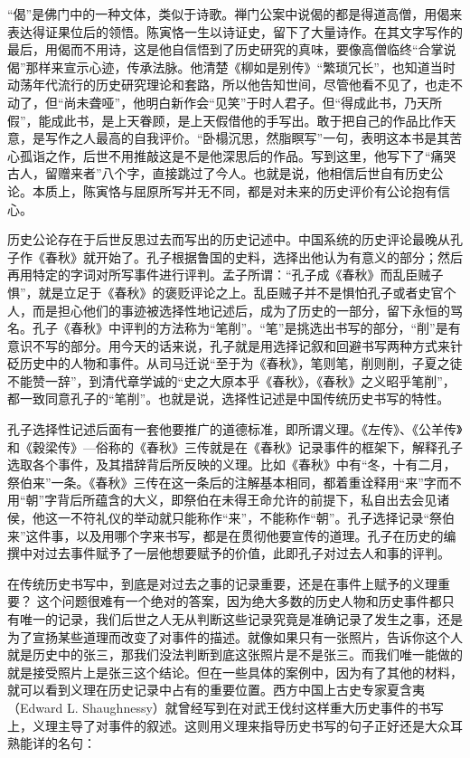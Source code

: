
“偈”是佛门中的一种文体，类似于诗歌。禅门公案中说偈的都是得道高僧，用偈来表达得证果位后的领悟。陈寅恪一生以诗证史，留下了大量诗作。在其文字写作的最后，用偈而不用诗，这是他自信悟到了历史研究的真味，要像高僧临终“合掌说偈”那样来宣示心迹，传承法脉。他清楚《柳如是别传》“繁琐冗长”，也知道当时动荡年代流行的历史研究理论和套路，所以他告知世间，尽管他看不见了，也走不动了，但“尚未聋哑”，他明白新作会“见笑”于时人君子。但“得成此书，乃天所假”，能成此书，是上天眷顾，是上天假借他的手写出。敢于把自己的作品比作天意，是写作之人最高的自我评价。“卧榻沉思，然脂瞑写”一句，表明这本书是其苦心孤诣之作，后世不用推敲这是不是他深思后的作品。写到这里，他写下了“痛哭古人，留赠来者”八个字，直接跳过了今人。也就是说，他相信后世自有历史公论。本质上，陈寅恪与屈原所写并无不同，都是对未来的历史评价有公论抱有信心。



历史公论存在于后世反思过去而写出的历史记述中。中国系统的历史评论最晚从孔子作《春秋》就开始了。孔子根据鲁国的史料，选择出他认为有意义的部分；然后再用特定的字词对所写事件进行评判。孟子所谓：“孔子成《春秋》而乱臣贼子惧”，就是立足于《春秋》的褒贬评论之上。乱臣贼子并不是惧怕孔子或者史官个人，而是担心他们的事迹被选择性地记述后，成为了历史的一部分，留下永恒的骂名。孔子《春秋》中评判的方法称为“笔削”。“笔”是挑选出书写的部分，“削”是有意识不写的部分。用今天的话来说，孔子就是用选择记叙和回避书写两种方式来针砭历史中的人物和事件。从司马迁说“至于为《春秋》，笔则笔，削则削，子夏之徒不能赞一辞”，到清代章学诚的“史之大原本乎《春秋》，《春秋》之义昭乎笔削”，都一致同意孔子的“笔削”。也就是说，选择性记述是中国传统历史书写的特性。



孔子选择性记述后面有一套他要推广的道德标准，即所谓义理。《左传》、《公羊传》和《穀梁传》—俗称的《春秋》三传就是在《春秋》记录事件的框架下，解释孔子选取各个事件，及其措辞背后所反映的义理。比如《春秋》中有“冬，十有二月，祭伯来”一条。《春秋》三传在这一条后的注解基本相同，都着重诠释用“来”字而不用“朝”字背后所蕴含的大义，即祭伯在未得王命允许的前提下，私自出去会见诸侯，他这一不符礼仪的举动就只能称作“来”，不能称作“朝”。孔子选择记录“祭伯来”这件事，以及用哪个字来书写，都是在贯彻他要宣传的道理。孔子在历史的编撰中对过去事件赋予了一层他想要赋予的价值，此即孔子对过去人和事的评判。



在传统历史书写中，到底是对过去之事的记录重要，还是在事件上赋予的义理重要？ 这个问题很难有一个绝对的答案，因为绝大多数的历史人物和历史事件都只有唯一的记录，我们后世之人无从判断这些记录究竟是准确记录了发生之事，还是为了宣扬某些道理而改变了对事件的描述。就像如果只有一张照片，告诉你这个人就是历史中的张三，那我们没法判断到底这张照片是不是张三。而我们唯一能做的就是接受照片上是张三这个结论。但在一些具体的案例中，因为有了其他的材料，就可以看到义理在历史记录中占有的重要位置。西方中国上古史专家夏含夷（Edward L. Shaughnessy）就曾经写到在对武王伐纣这样重大历史事件的书写上，义理主导了对事件的叙述。这则用义理来指导历史书写的句子正好还是大众耳熟能详的名句：



